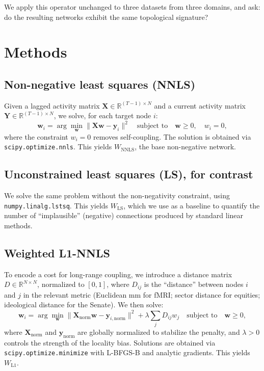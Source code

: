 \documentclass[11pt,a4paper]{article}
\begin{document}
We apply this operator unchanged to three datasets from three domains, and ask: do the resulting networks exhibit the same topological signature?

\section{Methods}

\subsection{Non-negative least squares (NNLS)}
Given a lagged activity matrix $\mathbf{X} \in \mathbb{R}^{(T-1) \times N}$ and a current activity matrix $\mathbf{Y} \in \mathbb{R}^{(T-1) \times N}$, we solve, for each target node $i$:
\begin{equation}
    \mathbf{w}_i = \arg\min_{\mathbf{w}} \|\mathbf{X}\mathbf{w} - \mathbf{y}_i\|^2 \quad \text{subject to} \quad \mathbf{w} \ge 0, \quad w_i = 0,
\end{equation}
where the constraint $w_i = 0$ removes self-coupling. The solution is obtained via \texttt{scipy.optimize.nnls}. This yields $W_{\text{NNLS}}$, the base non-negative network.

\subsection{Unconstrained least squares (LS), for contrast}
We solve the same problem without the non-negativity constraint, using \texttt{numpy.linalg.lstsq}. This yields $W_{\text{LS}}$, which we use as a baseline to quantify the number of ``implausible'' (negative) connections produced by standard linear methods.

\subsection{Weighted L1-NNLS}
To encode a cost for long-range coupling, we introduce a distance matrix $D \in \mathbb{R}^{N \times N}$, normalized to $[0, 1]$, where $D_{ij}$ is the ``distance'' between nodes $i$ and $j$ in the relevant metric (Euclidean mm for fMRI; sector distance for equities; ideological distance for the Senate). We then solve:
\begin{equation}
    \mathbf{w}_i = \arg\min_{\mathbf{w}} \|\mathbf{X}_{\text{norm}}\mathbf{w} - \mathbf{y}_{i,\text{norm}}\|^2 + \lambda \sum_j D_{ij} w_j \quad \text{subject to} \quad \mathbf{w} \ge 0,
\end{equation}
where $\mathbf{X}_{\text{norm}}$ and $\mathbf{y}_{\text{norm}}$ are globally normalized to stabilize the penalty, and $\lambda > 0$ controls the strength of the locality bias. Solutions are obtained via \texttt{scipy.optimize.minimize} with L-BFGS-B and analytic gradients. This yields $W_{\text{L1}}$.
\end{document}
